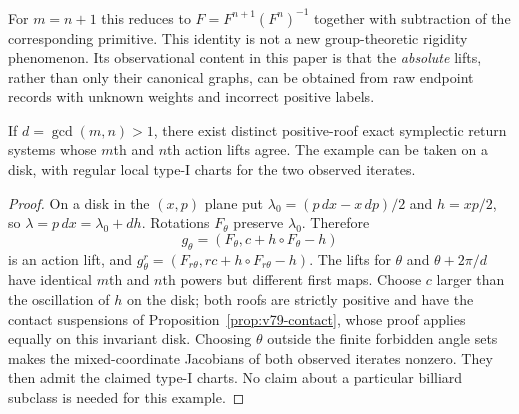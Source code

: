 For $m=n+1$ this reduces to $F=F^{n+1}(F^n)^{-1}$ together with
subtraction of the corresponding primitive.  This identity is not a
new group-theoretic rigidity phenomenon.  Its observational content in
this paper is that the \emph{absolute} lifts, rather than only their
canonical graphs, can be obtained from raw endpoint records with
unknown weights and incorrect positive labels.

\begin{proposition}
\label{prop:v80-coprime-sharp}
If $d=\gcd(m,n)>1$, there exist distinct positive-roof exact symplectic
return systems whose $m$th and $n$th action lifts agree.  The example
can be taken on a disk, with regular local type-I charts for the two
observed iterates.
\end{proposition}
\begin{proof}
On a disk in the $(x,p)$ plane put
$\lambda_0=(p\,dx-x\,dp)/2$ and $h=xp/2$, so
$\lambda=p\,dx=\lambda_0+dh$.  Rotations $F_\theta$ preserve
$\lambda_0$.  Therefore
\[
 g_\theta=(F_\theta,c+h\circ F_\theta-h)
\]
is an action lift, and
$g_\theta^r=(F_{r\theta},rc+h\circ F_{r\theta}-h)$.
The lifts for $\theta$ and $\theta+2\pi/d$ have identical $m$th and
$n$th powers but different first maps.  Choose $c$ larger than the
oscillation of $h$ on the disk; both roofs are strictly positive and
have the contact suspensions of Proposition~\ref{prop:v79-contact},
whose proof applies equally on this invariant disk.  Choosing $\theta$
outside the finite forbidden angle sets makes the mixed-coordinate
Jacobians of both observed iterates nonzero.  They then admit the
claimed type-I charts.  No claim about a particular billiard subclass
is needed for this example.
\end{proof}

